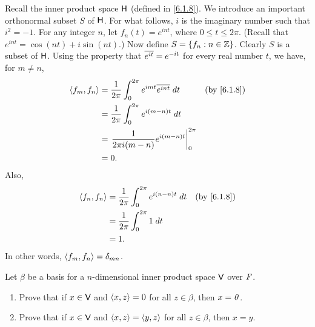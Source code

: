\begin{eg}\label{6.1.13}
  Recall the inner product space \(\mathsf{H}\) (defined in \cref{6.1.8}).
  We introduce an important orthonormal subset \(S\) of \(\mathsf{H}\).
  For what follows, \(i\) is the imaginary number such that \(i^2 = -1\).
  For any integer \(n\), let \(f_n(t) = e^{int}\), where \(0 \leq t \leq 2 \pi\).
  (Recall that \(e^{int} = \cos(nt) + i \sin(nt)\).)
  Now define \(S = \left\lbrace f_n : n \in \mathbb{Z}\right\rbrace\).
  Clearly \(S\) is a subset of \(\mathsf{H}\).
  Using the property that \(\overline{e^{it}} = e^{-it}\) for every real number \(t\), we have, for \(m \neq n\),
  \begin{align*}
    \inn{f_m, f_n} & = \frac{1}{2 \pi} \int_0^{2 \pi} e^{imt} \conj{e^{int}} \; dt &  & \by{6.1.8} \\
                   & = \frac{1}{2 \pi} \int_0^{2 \pi} e^{i(m - n)t} \; dt                          \\
                   & = \eval{\frac{1}{2 \pi i(m - n)} e^{i(m - n)t}}_0^{2 \pi}                     \\
                   & = 0.
  \end{align*}
  Also,
  \begin{align*}
    \inn{f_n, f_n} & = \frac{1}{2 \pi} \int_0^{2 \pi} e^{i(n - n)t} \; dt &  & \by{6.1.8} \\
                   & = \frac{1}{2 \pi} \int_0^{2 \pi} 1 \; dt                             \\
                   & = 1.
  \end{align*}
  In other words, \(\left\langle f_m, f_n\right\rangle = \delta_{m n}\).
\end{eg}

\exercisesection

\setcounter{ex}{8}
\begin{ex}\label{ex:6.1.9}
  Let \(\beta\) be a basis for a \(n\)-dimensional inner product space \(\mathsf{V}\) over \(\mathit{F}\).
  \begin{enumerate}
    \item Prove that if \(x \in \mathsf{V}\) and \(\left\langle x, z\right\rangle = 0\) for all \(z \in \beta\), then \(x = \mathit{0}\).
    \item Prove that if \(x \in \mathsf{V}\) and \(\left\langle x, z\right\rangle = \left\langle y, z\right\rangle\) for all \(z \in \beta\), then \(x = y\).
  \end{enumerate}
\end{ex}


